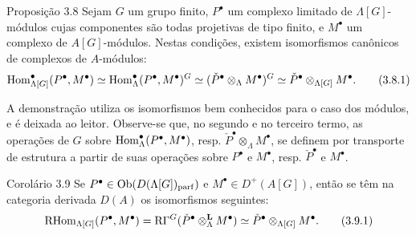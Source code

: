 \begin{statement}{Proposição 3.8}
Sejam $G$ um grupo finito, $P^\bullet$ um complexo limitado de $\Lambda[G]$-módulos cujas componentes são todas projetivas de tipo finito, e $M^\bullet$ um complexo de $A[G]$-módulos. Nestas condições, existem isomorfismos canônicos de complexos de $A$-módulos:
\[
\operatorname{Hom}_{\Lambda[G]}^\bullet(P^\bullet,M^\bullet)
\simeq \operatorname{Hom}_\Lambda^\bullet(P^\bullet,M^\bullet)^G
\simeq (\check P^\bullet\otimes_\Lambda M^\bullet)^G
\simeq \check P^\bullet\otimes_{\Lambda[G]}M^\bullet.
\tag{3.8.1}
\]
\end{statement}

A demonstração utiliza os isomorfismos bem conhecidos para o caso dos módulos, e é deixada ao leitor. Observe-se que, no segundo e no terceiro termo, as operações de $G$ sobre $\operatorname{Hom}_\Lambda^\bullet(P^\bullet,M^\bullet)$, resp. $\check P^\bullet\otimes_\Lambda M^\bullet$, se definem por transporte de estrutura a partir de suas operações sobre $P^\bullet$ e $M^\bullet$, resp. $\check P^\bullet$ e $M^\bullet$.

\begin{statement}{Corolário 3.9}
Se $P^\bullet\in \operatorname{Ob}(D(\Lambda[G])_{\mathrm{parf}})$ e $M^\bullet\in D^+(A[G])$, então se têm na categoria derivada $D(A)$ os isomorfismos seguintes:
\[
\mathrm{RHom}_{\Lambda[G]}(P^\bullet,M^\bullet)
=\mathrm{R}\Gamma^G(\check P^\bullet\otimes_\Lambda^{\mathbf L}M^\bullet)
\simeq \check P^\bullet\otimes_{\Lambda[G]}M^\bullet.
\tag{3.9.1}
\]
\end{statement}
